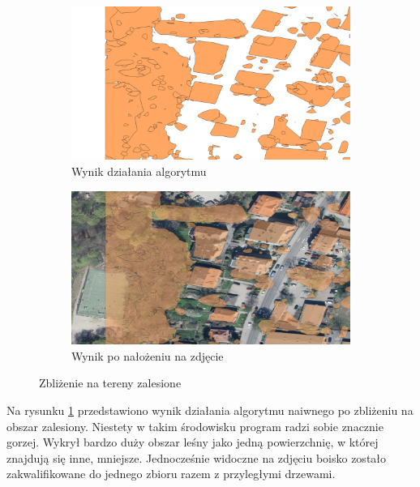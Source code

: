 \begin{figure}[h!]
    \centering
    \begin{subfigure}[b]{0.5\linewidth}
        \includegraphics[width=\linewidth]{img/wynik_naiwny_las.png}
        \caption{Wynik działania algorytmu}
    \end{subfigure}%
    \begin{subfigure}[b]{0.5\linewidth}
        \includegraphics[width=\linewidth]{img/wynik_naiwny_las_real.png}
        \caption{Wynik po nałożeniu na zdjęcie}
    \end{subfigure}%
    \caption{Zbliżenie na tereny zalesione}
    \label{fig:wynik_naiwny_las}
\end{figure}

Na rysunku \ref{fig:wynik_naiwny_las} przedstawiono wynik działania algorytmu naiwnego po
zbliżeniu na obszar zalesiony. Niestety w takim środowisku program radzi sobie znacznie gorzej.
Wykrył bardzo duży obszar leśny jako jedną powierzchnię, w której znajdują się inne, mniejsze.
Jednocześnie widoczne na zdjęciu boisko zostało zakwalifikowane do jednego zbioru razem z 
przyległymi drzewami.

